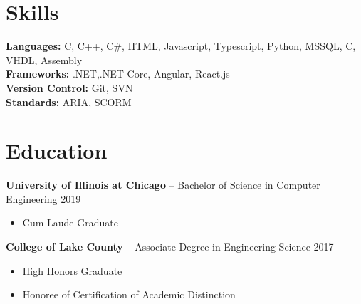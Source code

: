 \documentclass[11pt,letterpaper]{article}
\begin{document}
%
\section*{Skills}
\textbf{Languages:} C, C++, C\#, HTML, Javascript, Typescript, Python, MSSQL, C, VHDL, Assembly \\
\textbf{Frameworks:} .NET,.NET Core, Angular, React.js \\
\textbf{Version Control:} Git, SVN \\
\textbf{Standards:} ARIA, SCORM \\




\section*{Education}
\textbf{University of Illinois at Chicago} -- Bachelor of Science in Computer Engineering \hfill 2019 \\
\vspace{-8pt}
\begin{itemize}
  \item Cum Laude Graduate
\end{itemize}
\textbf{College of Lake County} -- Associate Degree in Engineering Science  \hfill 2017
\vspace{-8pt}
\begin{itemize}
  \item High Honors Graduate
  \item Honoree of Certification of Academic Distinction
\end{itemize}

\end{document}
